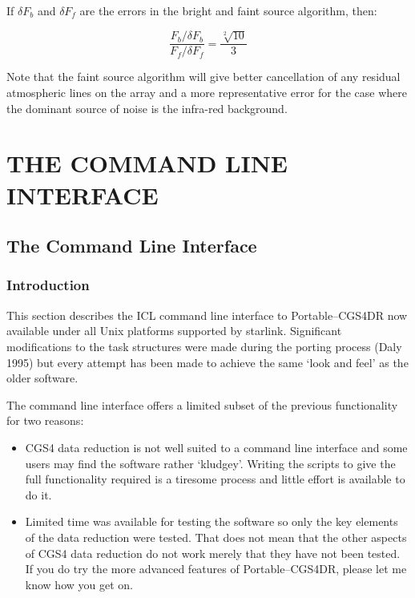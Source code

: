 \documentclass[a4paper]{book}
\newcommand{\stardocinitials}  {SUN}
\newcommand{\stardocnumber}    {27.5}
\newcommand{\stardocname}{\stardocinitials /\stardocnumber}
\renewcommand{\_}{{\tt\char'137}}
\begin{document}
If $\delta F_{b}$ and $\delta F_{f}$ are the errors in the bright and faint
source algorithm, then:

\begin{equation}
  \frac{F_{b} / \delta F_{b}}{F_{f} / \delta F_{f}} = \frac{\sqrt[2]{10}}{3} 
\label{equation_10}
\end{equation}

Note that the faint source algorithm will give better cancellation of any
residual atmospheric lines on the array and a more representative error
for the case where the dominant source of noise is the infra-red
background. 

\part{THE COMMAND LINE INTERFACE}
\pagestyle{myheadings}
\markboth{ICL Interface}{\stardocname}

\chapter{The Command Line Interface}
\section{Introduction}
This section describes the ICL command line interface to
Portable--CGS4DR now available under all Unix platforms supported by
{\sc starlink}. Significant modifications to the task structures were made
during the porting process (Daly 1995) but every attempt has been made to achieve the
same `look and feel' as the older software. 

The command line interface offers a limited subset of the previous 
functionality for two reasons:

\begin{itemize}
\item CGS4 data reduction is not well suited to a command line interface
      and some users may find the software rather `kludgey'. 
      Writing the scripts to give the full functionality required is a 
      tiresome process and little effort is available to do it.
\item Limited time was available for testing the software so only the key 
      elements of the data reduction were tested. That does not mean that the
      other aspects of CGS4 data reduction do not work merely that they have
      not been tested. If you do try the more advanced features of Portable--CGS4DR,
      please let me know how you get on.
\end{itemize}
\end{document}
